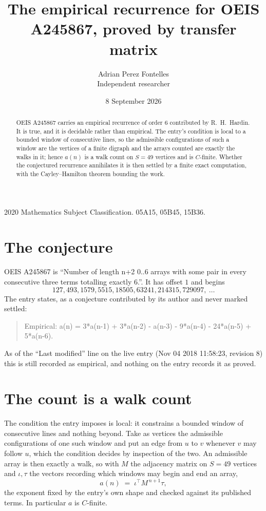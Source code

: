 \documentclass[11pt,a4paper]{article}
\title{The empirical recurrence for OEIS A245867, proved by transfer matrix}
\author{Adrian Perez Fontelles\\ \small Independent researcher}
\date{8 September 2026}
\theoremstyle{plain}
\theoremstyle{definition}
\begin{document}
\maketitle

\begin{abstract}
OEIS A245867 carries an empirical recurrence of order $6$ contributed by R.~H.~Hardin. It is
true, and it is decidable rather than empirical. The entry's condition is local to a bounded window of consecutive lines, so
the admissible configurations of such a window are the vertices of a finite digraph and the
arrays counted are exactly the walks in it; hence $a(n)$ is a walk count on $S=49$ vertices
and is $C$-finite. Whether the conjectured recurrence annihilates it is then settled by a
finite exact computation, with the Cayley--Hamilton theorem bounding the work.
\end{abstract}

\noindent\small 2020 Mathematics Subject Classification. 05A15, 05B45, 15B36.\normalsize

\section{The conjecture}

OEIS A245867 is ``Number of length n+2 0..6 arrays with some pair in every consecutive three terms totalling exactly 6.''. It has offset $1$ and begins
\[
127, 493, 1579, 5515, 18505, 63241, 214315, 729097,\ \dots
\]
The entry states, as a conjecture contributed by its author and never marked settled:
\begin{quote}
Empirical: a(n) = 3*a(n-1) + 3*a(n-2) - a(n-3) - 9*a(n-4) - 24*a(n-5) + 5*a(n-6).
\end{quote}
As of the ``Last modified'' line on the live entry (Nov 04 2018 11:58:23, revision 8) this is still
recorded as empirical, and nothing on the entry records it as proved.

\section{The count is a walk count}

The condition the entry imposes is local: it constrains a bounded window of consecutive lines and nothing beyond. Take as
vertices the admissible configurations of one such window and put an edge from $u$ to $v$
whenever $v$ may follow $u$, which the condition decides by inspection of the two. An
admissible array is then exactly a walk, so with $M$ the adjacency matrix on $S=49$ vertices
and $\iota,\tau$ the vectors recording which windows may begin and end an array,
\[
a(n)\;=\;\iota^{\!\top}M^{\,n+1}\tau ,
\]
the exponent fixed by the entry's own shape and checked against its published terms. In
particular $a$ is $C$-finite.
\end{document}
